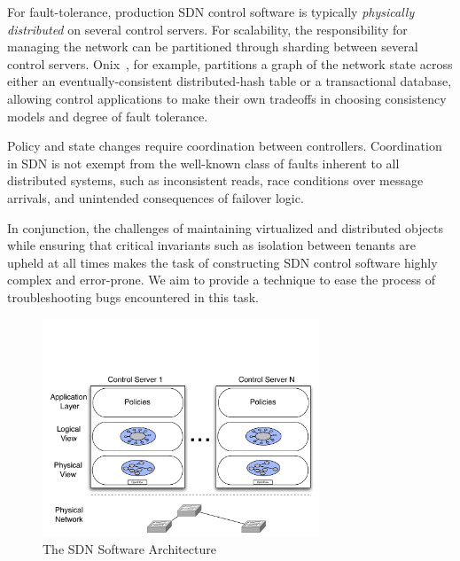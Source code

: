 {For fault-tolerance, production SDN control software is typically \emph{physically
distributed} on several control servers. For scalability, the responsibility for
managing the network can be partitioned through sharding between
several control servers. Onix~\cite{onix}, for example, partitions a
graph of the network state across either an eventually-consistent
distributed-hash table or a
transactional database, allowing control applications to make their own
tradeoffs in choosing consistency models and degree of fault tolerance.

Policy and state changes require coordination between controllers.
Coordination in SDN is not exempt from the well-known class of faults
inherent to all distributed systems, such as
inconsistent reads, race conditions over message arrivals, and
unintended consequences of failover logic.

In conjunction, the challenges of maintaining virtualized and distributed
objects while ensuring that critical invariants such as isolation between
tenants are upheld at all times makes the task of constructing
SDN control software highly complex and error-prone. We aim to provide a
technique to ease the process of troubleshooting bugs encountered in this
task.



\begin{figure}[t]
    \includegraphics[width=3.25in]{../diagrams/architecture/SDN_Stack.pdf}
    \caption[]{\label{fig:basicarch} The SDN Software Architecture }
\end{figure}

}
